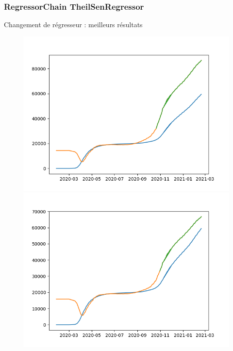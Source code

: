\documentclass{beamer}
\begin{document}
\begin{frame}
	\frametitle{RegressorChain TheilSenRegressor}
	Changement de régresseur : meilleurs résultats
	\begin{figure}[h]
		\includegraphics[scale=0.327]{theiltruc 90000 iter tol 0,001}
		\includegraphics[scale=0.327]{theiltruc 9000 iter tol 0,001; 10 jour de plus}
	\end{figure}
\end{frame}
\end{document}
